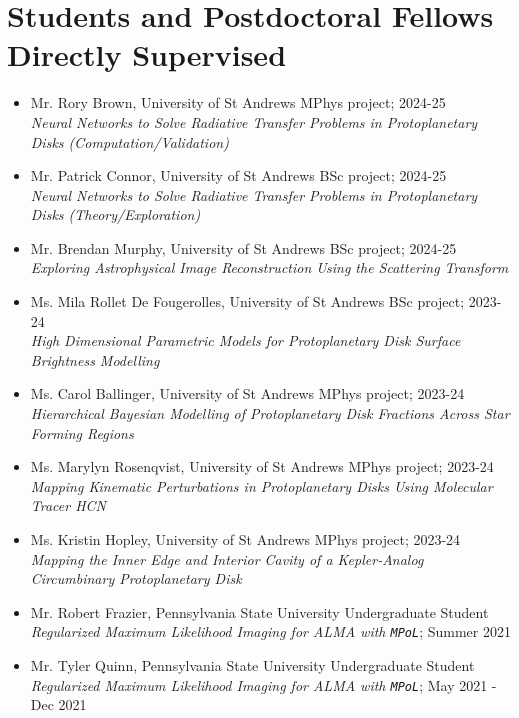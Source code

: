 \section*{Students and Postdoctoral Fellows Directly Supervised}
\begin{itemize}
  \item Mr. Rory Brown, University of St Andrews MPhys project; 2024-25 \\
  \emph{Neural Networks to Solve Radiative Transfer Problems in Protoplanetary Disks (Computation/Validation)}
  \item Mr. Patrick Connor, University of St Andrews BSc project; 2024-25\\
  \emph{Neural Networks to Solve Radiative Transfer Problems in Protoplanetary Disks (Theory/Exploration)}
  \item Mr. Brendan Murphy, University of St Andrews BSc project; 2024-25 \\
  \emph{Exploring Astrophysical Image Reconstruction Using the Scattering Transform}
  \item Ms. Mila Rollet De Fougerolles, University of St Andrews BSc project; 2023-24\\
  \emph{High Dimensional Parametric Models for Protoplanetary Disk Surface Brightness Modelling}
  \item Ms. Carol Ballinger, University of St Andrews MPhys project; 2023-24 \\
  \emph{Hierarchical Bayesian Modelling of Protoplanetary Disk Fractions Across Star Forming Regions}
  \item Ms. Marylyn Rosenqvist, University of St Andrews MPhys project; 2023-24 \\
  \emph{Mapping Kinematic Perturbations in Protoplanetary Disks Using Molecular Tracer HCN}
  \item Ms. Kristin Hopley, University of St Andrews MPhys project; 2023-24 \\
  \emph{Mapping the Inner Edge and Interior Cavity of a Kepler-Analog Circumbinary Protoplanetary
  Disk}
  \item Mr. Robert Frazier, Pennsylvania State University Undergraduate Student \\ 
  \emph{Regularized Maximum Likelihood Imaging for ALMA with \texttt{MPoL}}; Summer 2021
  \item Mr. Tyler Quinn, Pennsylvania State University Undergraduate Student \\ 
  \emph{Regularized Maximum Likelihood Imaging for ALMA with \texttt{MPoL}}; May 2021 - Dec 2021

\end{itemize}
